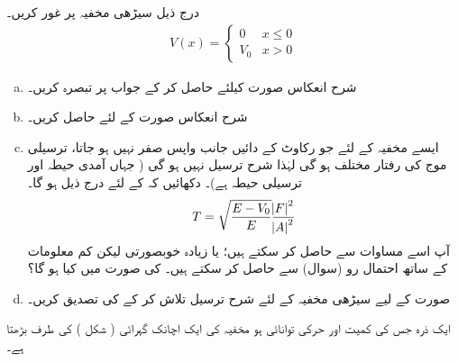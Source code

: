  درج ذیل سیڑھی مخفیہ پر غور کریں۔
\begin{align*}
V(x)=
\begin{cases}
0 & x\le 0\\
V_{0}&x> 0
\end{cases}
\end{align*}
%
\begin{enumerate}[a.]
\item
 شرح انعکاس  صورت کیلئے حاصل کر کے جواب پر تبصرہ کریں۔ 
\item
شرح انعکاس  صورت کے لئے حاصل کریں۔ 
\item
ایسے مخفیہ کے لئے جو رکاوٹ کے دائیں جانب واپس صفر نہیں ہو جاتا، ترسیلی موج کی رفتار مختلف ہو گی لہٰذا شرح ترسیل نہیں ہو گی ( جہاں آمدی حیطہ اور ترسیلی حیطہ ہے)۔ دکھائیں کہ  کے لئے درج ذیل ہو گا۔
\begin{align}
 T=\sqrt{\frac{E-V_{0}}{E} }\frac{\abs{F}^{2}}{\abs{A}^{2}} 
 \end{align}
  آپ اسے مساوات سے حاصل کر سکتے ہیں؛ یا زیادہ خوبصورتی لیکن کم معلومات کے ساتھ احتمال رو (سوال) سے حاصل کر سکتے ہیں۔  کی صورت میں  کیا ہو گا؟
\item

صورت  کے لیے سیڑھی مخفیہ کے لئے شرح ترسیل تلاش کر کے  کی تصدیق کریں۔
\end{enumerate}
ایک ذرہ جس کی کمیت  اور حرکی توانائی  ہو مخفیہ کی ایک اچانک گہرائی ( شکل ) کی طرف بڑھتا ہے۔ 

